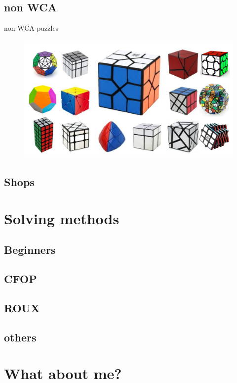 \documentclass{beamer}
\begin{document}
        \subsection{non WCA}
            \begin{frame}{non WCA puzzles}
                \begin{figure}
                    \includegraphics[width=\textwidth]{assets/nonWCAall.jpg}
                \end{figure}
            \end{frame}
        \subsection{Shops}

        
    \section{Solving methods}
        \subsection{Beginners}
        \subsection{CFOP}
        \subsection{ROUX}
        \subsection{others}
    \section{What about me?}
\end{document}
